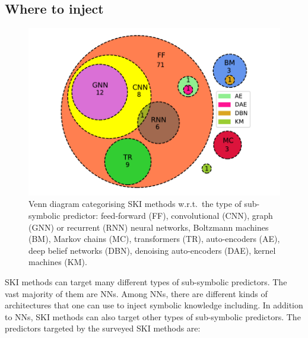 \subsection{Where to inject}\label{subsec:where-to-inject}
%
\begin{figure}
    \centering
    \includegraphics[width=.6\linewidth]{figures/ski-predictors}
    \caption[Venn diagram categorising SKI methods w.r.t. the predictor type]{
        Venn diagram categorising \gls{SKI} methods w.r.t.\ the type of sub-symbolic predictor: feed-forward (FF), convolutional (CNN), graph (GNN) or recurrent (RNN) neural networks, Boltzmann machines (BM), Markov chains (MC), transformers (TR), auto-encoders (AE), deep belief networks (DBN), denoising auto-encoders (DAE), kernel machines (KM).
    }
    \label{fig:pie-ski-predictors}
\end{figure}
%
\Gls{SKI} methods can target many different types of sub-symbolic predictors.
%
The vast majority of them are \glspl{NN}.
%
Among \glspl{NN}, there are different kinds of architectures that one can use to inject symbolic knowledge including.
%
In addition to \glspl{NN}, \gls{SKI} methods can also target other types of sub-symbolic predictors.
%
The predictors targeted by the surveyed \gls{SKI} methods are:
%
